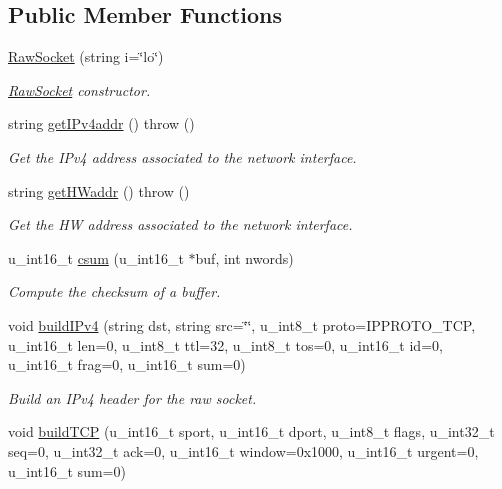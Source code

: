 \subsection*{Public Member Functions}
\begin{CompactItemize}
\item 
\hyperlink{classRawSocket_482e84c15438bb5b83d884f969d21e57}{RawSocket} (string i=\char`\"{}lo\char`\"{})
\begin{CompactList}\small\item\em \hyperlink{classRawSocket}{RawSocket} constructor. \item\end{CompactList}\item 
string \hyperlink{classRawSocket_334b006f4b102e3546ec444172d39a55}{getIPv4addr} ()  throw ()
\begin{CompactList}\small\item\em Get the IPv4 address associated to the network interface. \item\end{CompactList}\item 
string \hyperlink{classRawSocket_b2bcc0a5f1714d4d7a119332428c10ae}{getHWaddr} ()  throw ()
\begin{CompactList}\small\item\em Get the HW address associated to the network interface. \item\end{CompactList}\item 
u\_\-int16\_\-t \hyperlink{classRawSocket_973b337d963bdcff3ce68d0ef7ffb7e1}{csum} (u\_\-int16\_\-t $\ast$buf, int nwords)
\begin{CompactList}\small\item\em Compute the checksum of a buffer. \item\end{CompactList}\item 
void \hyperlink{classRawSocket_6c33975e6641e7d2e5ea34d3749c5cc5}{buildIPv4} (string dst, string src=\char`\"{}\char`\"{}, u\_\-int8\_\-t proto=IPPROTO\_\-TCP, u\_\-int16\_\-t len=0, u\_\-int8\_\-t ttl=32, u\_\-int8\_\-t tos=0, u\_\-int16\_\-t id=0, u\_\-int16\_\-t frag=0, u\_\-int16\_\-t sum=0)
\begin{CompactList}\small\item\em Build an IPv4 header for the raw socket. \item\end{CompactList}\item 
void \hyperlink{classRawSocket_ba3cca3e8ff995d5edbf064b3af8ca05}{buildTCP} (u\_\-int16\_\-t sport, u\_\-int16\_\-t dport, u\_\-int8\_\-t flags, u\_\-int32\_\-t seq=0, u\_\-int32\_\-t ack=0, u\_\-int16\_\-t window=0x1000, u\_\-int16\_\-t urgent=0, u\_\-int16\_\-t sum=0)

\end{CompactItemize}
